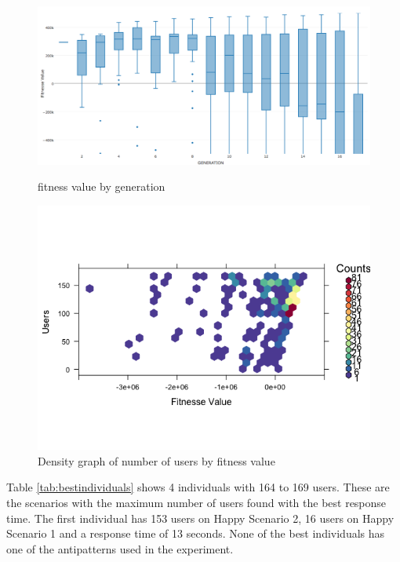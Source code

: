 \begin{figure}[H]
\begin{minipage}{.5\textwidth}
\centering
\includegraphics[width=1\textwidth]{./images/experiment1-5.png}
\caption{fitness value by generation}
\label{fig:summaryboxplot1}
\end{minipage}
\begin{minipage}{.5\textwidth}
\centering
\includegraphics[width=1\textwidth]{./images/experiment1-6.png}
\caption{Density graph of number of users by fitness value}
\label{fig:density1}
\end{minipage}
\end{figure}

Table \ref{tab:bestindividuals} shows 4 individuals with 164 to 169 users. These are the scenarios with the maximum number of users found with the best response time. The first individual has 153 users on Happy Scenario 2, 16 users on Happy Scenario 1 and a response time of 13 seconds. None of the best individuals has one of the antipatterns used in the experiment.



